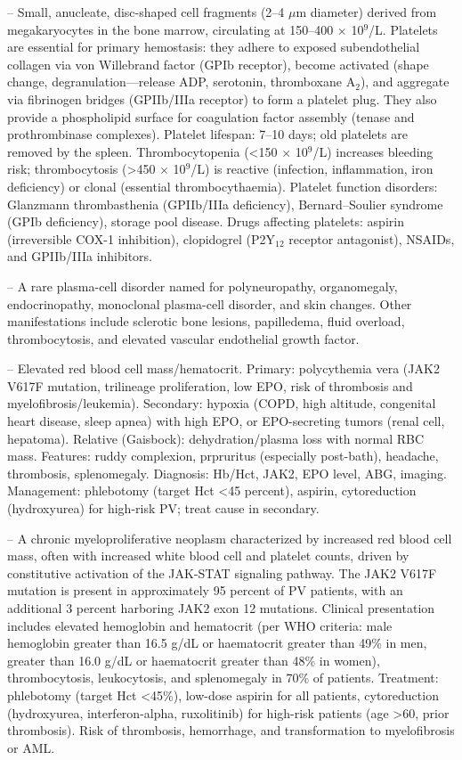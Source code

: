 -- Small, anucleate, disc-shaped cell fragments (2--4 \(\mu\)m diameter) derived from megakaryocytes in the bone marrow, circulating at 150--400 \(\times\) 10\(^9\)/L. Platelets are essential for primary hemostasis: they adhere to exposed subendothelial collagen via von Willebrand factor (GPIb receptor), become activated (shape change, degranulation—release ADP, serotonin, thromboxane A$_2$), and aggregate via fibrinogen bridges (GPIIb/IIIa receptor) to form a platelet plug. They also provide a phospholipid surface for coagulation factor assembly (tenase and prothrombinase complexes). Platelet lifespan: 7--10 days; old platelets are removed by the spleen. Thrombocytopenia (<150 \(\times\) 10\(^9\)/L) increases bleeding risk; thrombocytosis (>450 \(\times\) 10\(^9\)/L) is reactive (infection, inflammation, iron deficiency) or clonal (essential thrombocythaemia). Platelet function disorders: Glanzmann thrombasthenia (GPIIb/IIIa deficiency), Bernard–Soulier syndrome (GPIb deficiency), storage pool disease. Drugs affecting platelets: aspirin (irreversible COX-1 inhibition), clopidogrel (P2Y\(_{12}\) receptor antagonist), NSAIDs, and GPIIb/IIIa inhibitors.

-- A rare plasma-cell disorder named for polyneuropathy, organomegaly, endocrinopathy, monoclonal plasma-cell disorder, and skin changes. Other manifestations include sclerotic bone lesions, papilledema, fluid overload, thrombocytosis, and elevated vascular endothelial growth factor.

-- Elevated red blood cell mass/hematocrit. Primary: polycythemia vera (JAK2 V617F mutation, trilineage proliferation, low EPO, risk of thrombosis and myelofibrosis/leukemia). Secondary: hypoxia (COPD, high altitude, congenital heart disease, sleep apnea) with high EPO, or EPO-secreting tumors (renal cell, hepatoma). Relative (Gaisbock): dehydration/plasma loss with normal RBC mass. Features: ruddy complexion, prpruritus (especially post-bath), headache, thrombosis, splenomegaly. Diagnosis: Hb/Hct, JAK2, EPO level, ABG, imaging. Management: phlebotomy (target Hct <45 percent), aspirin, cytoreduction (hydroxyurea) for high-risk PV; treat cause in secondary.

-- A chronic myeloproliferative neoplasm characterized by increased red blood cell mass, often with increased white blood cell and platelet counts, driven by constitutive activation of the JAK-STAT signaling pathway. The JAK2 V617F mutation is present in approximately 95 percent of PV patients, with an additional 3 percent harboring JAK2 exon 12 mutations. Clinical presentation includes elevated hemoglobin and hematocrit (per WHO criteria: male hemoglobin greater than 16.5 g/dL or haematocrit greater than 49\% in men, greater than 16.0 g/dL or haematocrit greater than 48\% in women), thrombocytosis, leukocytosis, and splenomegaly in 70\% of patients. Treatment: phlebotomy (target Hct <45\%), low-dose aspirin for all patients, cytoreduction (hydroxyurea, interferon-alpha, ruxolitinib) for high-risk patients (age >60, prior thrombosis). Risk of thrombosis, hemorrhage, and transformation to myelofibrosis or AML.

